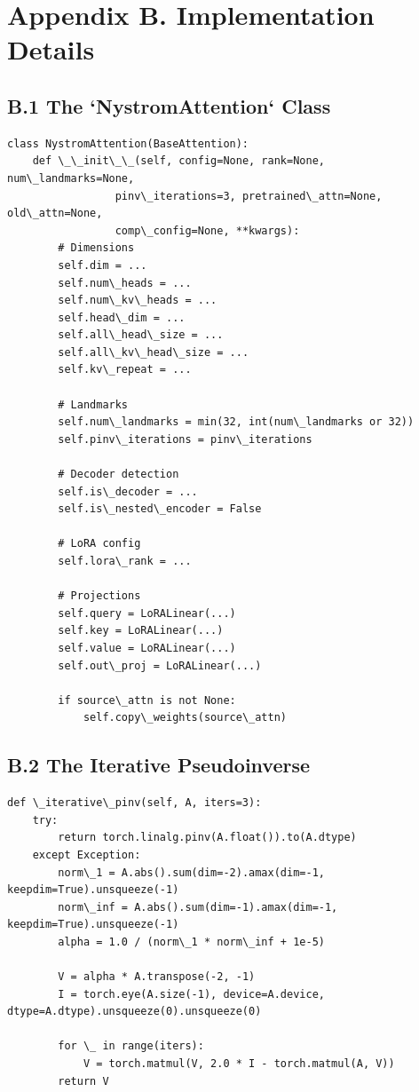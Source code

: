 
\section{Appendix B. Implementation Details}

\subsection{B.1 The `NystromAttention` Class}

\begin{lstlisting}
class NystromAttention(BaseAttention):
    def \_\_init\_\_(self, config=None, rank=None, num\_landmarks=None,
                 pinv\_iterations=3, pretrained\_attn=None, old\_attn=None,
                 comp\_config=None, **kwargs):
        # Dimensions
        self.dim = ...
        self.num\_heads = ...
        self.num\_kv\_heads = ...
        self.head\_dim = ...
        self.all\_head\_size = ...
        self.all\_kv\_head\_size = ...
        self.kv\_repeat = ...
        
        # Landmarks
        self.num\_landmarks = min(32, int(num\_landmarks or 32))
        self.pinv\_iterations = pinv\_iterations
        
        # Decoder detection
        self.is\_decoder = ...
        self.is\_nested\_encoder = False
        
        # LoRA config
        self.lora\_rank = ...
        
        # Projections
        self.query = LoRALinear(...)
        self.key = LoRALinear(...)
        self.value = LoRALinear(...)
        self.out\_proj = LoRALinear(...)
        
        if source\_attn is not None:
            self.copy\_weights(source\_attn)
\end{lstlisting}

\subsection{B.2 The Iterative Pseudoinverse}

\begin{lstlisting}
def \_iterative\_pinv(self, A, iters=3):
    try:
        return torch.linalg.pinv(A.float()).to(A.dtype)
    except Exception:
        norm\_1 = A.abs().sum(dim=-2).amax(dim=-1, keepdim=True).unsqueeze(-1)
        norm\_inf = A.abs().sum(dim=-1).amax(dim=-1, keepdim=True).unsqueeze(-1)
        alpha = 1.0 / (norm\_1 * norm\_inf + 1e-5)
        
        V = alpha * A.transpose(-2, -1)
        I = torch.eye(A.size(-1), device=A.device, dtype=A.dtype).unsqueeze(0).unsqueeze(0)
        
        for \_ in range(iters):
            V = torch.matmul(V, 2.0 * I - torch.matmul(A, V))
        return V
\end{lstlisting}

